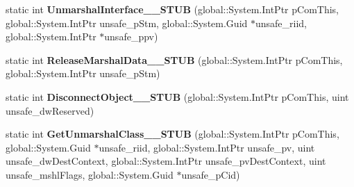 \begin{DoxyCompactItemize}
\item 
\mbox{\label{struct_system_1_1_runtime_1_1_interop_services_1_1_i_marshal_____system___runtime___windows_runtime_____impl_1_1_vtbl_a6325016e621765b68878de65e7fe333e}} 
static int {\bfseries Unmarshal\+Interface\+\_\+\+\_\+\+S\+T\+UB} (global\+::\+System.\+Int\+Ptr p\+Com\+This, global\+::\+System.\+Int\+Ptr unsafe\+\_\+p\+Stm, global\+::\+System.\+Guid $\ast$unsafe\+\_\+riid, global\+::\+System.\+Int\+Ptr $\ast$unsafe\+\_\+ppv)
\item 
\mbox{\label{struct_system_1_1_runtime_1_1_interop_services_1_1_i_marshal_____system___runtime___windows_runtime_____impl_1_1_vtbl_acb4ef2d5853f6ed1823d32c7939a9c80}} 
static int {\bfseries Release\+Marshal\+Data\+\_\+\+\_\+\+S\+T\+UB} (global\+::\+System.\+Int\+Ptr p\+Com\+This, global\+::\+System.\+Int\+Ptr unsafe\+\_\+p\+Stm)
\item 
\mbox{\label{struct_system_1_1_runtime_1_1_interop_services_1_1_i_marshal_____system___runtime___windows_runtime_____impl_1_1_vtbl_a190a87511db9790b75721ec9fbbf6db5}} 
static int {\bfseries Disconnect\+Object\+\_\+\+\_\+\+S\+T\+UB} (global\+::\+System.\+Int\+Ptr p\+Com\+This, uint unsafe\+\_\+dw\+Reserved)
\item 
\mbox{\label{struct_system_1_1_runtime_1_1_interop_services_1_1_i_marshal_____system___runtime___windows_runtime_____impl_1_1_vtbl_a952344c0b9708ed27abae95ba1e22bc8}} 
static int {\bfseries Get\+Unmarshal\+Class\+\_\+\+\_\+\+S\+T\+UB} (global\+::\+System.\+Int\+Ptr p\+Com\+This, global\+::\+System.\+Guid $\ast$unsafe\+\_\+riid, global\+::\+System.\+Int\+Ptr unsafe\+\_\+pv, uint unsafe\+\_\+dw\+Dest\+Context, global\+::\+System.\+Int\+Ptr unsafe\+\_\+pv\+Dest\+Context, uint unsafe\+\_\+mshl\+Flags, global\+::\+System.\+Guid $\ast$unsafe\+\_\+p\+Cid)
\item 
\mbox{\label{struct_system_1_1_runtime_1_1_interop_services_1_1_i_marshal_____system___runtime___windows_runtime_____impl_1_1_vtbl_ae262511ad2d922da2fa5f9b7b21f17fa}} 

\end{DoxyCompactItemize}
